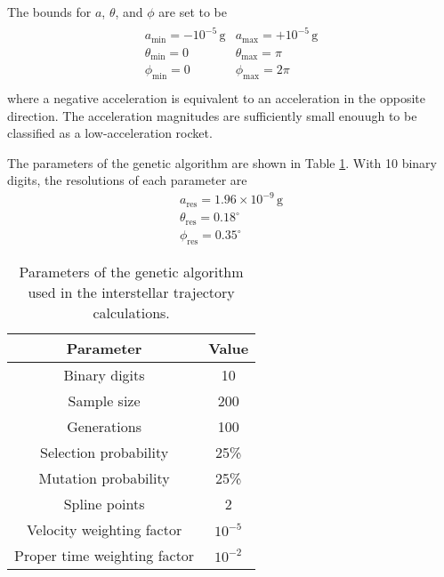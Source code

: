 \documentclass[review]{elsarticle}
\begin{document}
The bounds for $a$, $\theta$, and $\phi$ are set to be
\begin{gather}
\begin{array}{ll}
a_{\min}=-10^{-5}\,\mathrm{g} & a_{\max}=+10^{-5}\,\mathrm{g}\\
\theta_{\min}=0 & \theta_{\max}=\pi\\
\phi_{\min}=0 & \phi_{\max}=2\pi\\
\end{array}
\end{gather}
where a negative acceleration is equivalent to an acceleration in the opposite direction. The acceleration magnitudes are sufficiently small enouugh to be classified as a low-acceleration rocket.  

The parameters of the genetic algorithm are shown in Table \ref{variousparam}. With 10 binary digits, the resolutions of each parameter are
\begin{gather}
a_{\mathrm{res}}=1.96\times10^{-9}\,\mathrm{g}\\
\theta_{\mathrm{res}}=0.18^\circ\\
\phi_{\mathrm{res}}=0.35^\circ
\end{gather}

\begin{table}[h!]
\begin{center}
\begin{tabular}{|c|c|}
\hline
Parameter & Value\\
\hline
Binary digits & 10\\
\hline
Sample size & 200\\
\hline
Generations & 100\\
\hline
Selection probability & 25\%\\
\hline
Mutation probability & 25\%\\
\hline
Spline points & 2\\
\hline
Velocity weighting factor & $10^{-5}$\\
\hline
Proper time weighting factor & $10^{-2}$\\
\hline
\end{tabular}
\caption{Parameters of the genetic algorithm used in the interstellar trajectory calculations.}
\label{variousparam}
\end{center}
\end{table}
\end{document}
